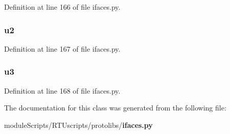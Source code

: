 Definition at line 166 of file ifaces.\+py.

\subsubsection[{u2}]{\setlength{\rightskip}{0pt plus 5cm}u2}\label{classprotolibs_1_1ifaces_1_1_u_d_p_test_aa76d8c8015643c6a837661a10142016e}


Definition at line 167 of file ifaces.\+py.

\subsubsection[{u3}]{\setlength{\rightskip}{0pt plus 5cm}u3}\label{classprotolibs_1_1ifaces_1_1_u_d_p_test_adad1ef51b879799793dc38d714b97063}


Definition at line 168 of file ifaces.\+py.



The documentation for this class was generated from the following file\+:\begin{DoxyCompactItemize}
\item 
module\+Scripts/\+R\+T\+Uscripts/protolibs/{\bf ifaces.\+py}\end{DoxyCompactItemize}
